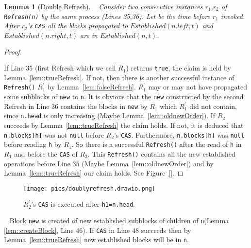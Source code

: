 \documentclass[10pt]{article}
\newtheorem{lemma}[theorem]{Lemma}
\theoremstyle{definition}
\begin{document}
\begin{lemma}[Double Refresh] \label{doubleRefresh}
  Consider two consecutive instances $r_1$,$r_2$ of \texttt{Refresh(n)} by the same process (Lines 35,36). Let be the time before $r_1$ invoked. After $r_2$'s \texttt{CAS} all the blocks propagated to $Established(n.left, t)$ and $Established(n.right, t)$ are in $Established(n, t)$.
\end{lemma}
\begin{proof}
  

If Line 35 (first Refresh which we call $R_1$) returns \texttt{true}, the claim is held by Lemma~\ref{lem::trueRefresh}. If not, then there is another successful instance of \texttt{Refresh()} $R_1^\prime$ by Lemma~\ref{lem:falseRefresh}. $R_1^\prime$ may or may not have propagated some subblocks of \texttt{new} to \texttt{n}. It is obvious that the \texttt{new} constructed by the second Refresh in Line 36 contains the blocks in \texttt{new} by $R_1$ which $R_1^\prime$ did not contain, since \texttt{n.head} is only increasing (Maybe Lemma~\ref{lem::oldnewOrder}). If $R_2$ succeeds by Lemma~\ref{lem::trueRefresh} the claim holds. If not, it is deduced that \texttt{n.blocks[h]} was not \texttt{null} before $R_2$'s \texttt{CAS}. Furthermore, \texttt{n.blocks[h]} was \texttt{null} before reading \texttt{h} by $R_1$. So there is a successful \texttt{Refresh()} after the read of \texttt{h} in $R_1$ and before the \texttt{CAS} of $R_2$. This \texttt{Refresh()} contains all the new established operations before Line 35 (Maybe Lemma~\ref{lem::oldnewOrder}) and by Lemma~\ref{lem::trueRefresh} our claim holds. See Figure~\ref{}.
\end{proof}

\begin{figure}[hbt]
  \center\texttt{[image: pics/doublyrefresh.drawio.png]}
  \caption{$R_2^\prime$'s \texttt{CAS} is executed after \texttt{h1=n.head}.}
\end{figure}



  Block \texttt{new} is created of new established subblocks of children of \texttt{n}(Lemma \ref{lem::createBlock}, Line 46). If \texttt{CAS} in Line 48 succeeds then by Lemma~\ref{lem::trueRefresh} new established blocks will be in \texttt{n}.
  
\end{document}
